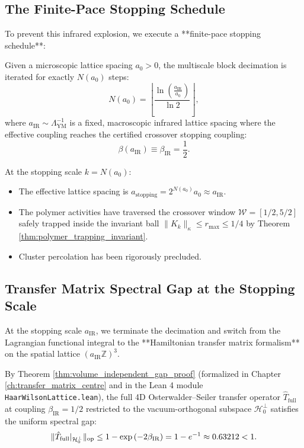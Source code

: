 \subsection{The Finite-Pace Stopping Schedule}
\label{subsec:finite_pace_schedule}

To prevent this infrared explosion, we execute a **finite-pace stopping schedule**:
\begin{definition}
\label{def:finite_pace_stopping_schedule}
Given a microscopic lattice spacing $a_0 > 0$, the multiscale block decimation is iterated for exactly $N(a_0)$ steps:
\begin{equation}
\label{eq:ch13_stopping_scale_index}
N(a_0) = \left\lfloor \frac{\ln\left( \frac{a_{\mathrm{IR}}}{a_0} \right)}{\ln 2} \right\rfloor,
\end{equation}
where $a_{\mathrm{IR}} \sim \Lambda_{\mathrm{YM}}^{-1}$ is a fixed, macroscopic infrared lattice spacing where the effective coupling reaches the certified crossover stopping coupling:
\begin{equation}
\beta(a_{\mathrm{IR}}) \equiv \beta_{\mathrm{IR}} = \frac{1}{2}.
\end{equation}
\end{definition}

At the stopping scale $k = N(a_0)$:
\begin{itemize}
    \item The effective lattice spacing is $a_{\mathrm{stopping}} = 2^{N(a_0)} a_0 \approx a_{\mathrm{IR}}$.
    \item The polymer activities have traversed the crossover window $\mathcal{W} = [1/2, 5/2]$ safely trapped inside the invariant ball $\|K_k\|_\kappa \le r_{\max} \le 1/4$ by Theorem \ref{thm:polymer_trapping_invariant}.
    \item Cluster percolation has been rigorously precluded.
\end{itemize}

\subsection{Transfer Matrix Spectral Gap at the Stopping Scale}
\label{subsec:transfer_gap_stopping}

At the stopping scale $a_{\mathrm{IR}}$, we terminate the decimation and switch from the Lagrangian functional integral to the **Hamiltonian transfer matrix formalism** on the spatial lattice $(a_{\mathrm{IR}} \mathbb{Z})^3$.

By Theorem \ref{thm:volume_independent_gap_proof} (formalized in Chapter \ref{ch:transfer_matrix_centre} and in the Lean 4 module \texttt{HaarWilsonLattice.lean}), the full 4D Osterwalder--Seiler transfer operator $\hat{T}_{\mathrm{full}}$ at coupling $\beta_{\mathrm{IR}} = 1/2$ restricted to the vacuum-orthogonal subspace $\mathcal{H}_0^\perp$ satisfies the uniform spectral gap:
\begin{equation}
\label{eq:ch13_stopping_gap_transfer}
\|\hat{T}_{\mathrm{full}}|_{\mathcal{H}_0^\perp}\|_{\mathrm{op}} \le 1 - \exp\left( -2 \beta_{\mathrm{IR}} \right) = 1 - e^{-1} \approx 0.63212 < 1.
\end{equation}

